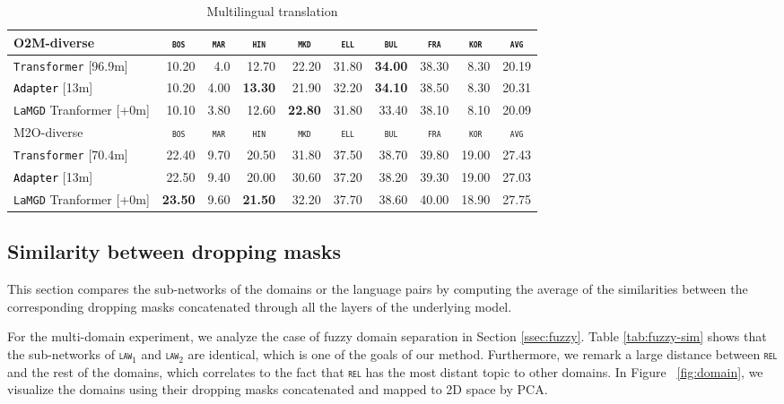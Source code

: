 \documentclass[11pt]{article}
\newcommand{\revision}[1]{\textcolor{black}{#1}}
\newcommand{\domain}[1]{\texttt{\textsc{#1}}}
\newcommand{\system}[1]{\texttt{{#1}}}
\newcommand{\SB}[1]{\textbf{#1}}
\begin{document}
\begin{table}[h!]
\begin{tabular}{|p{4cm}|*{9}{r|}}
    \hline
    \hline
    O2M-diverse & \multicolumn{1}{c|}{\domain{bos}} & \multicolumn{1}{c|}{\domain{mar}} & \multicolumn{1}{c|}{\domain{hin}} & \multicolumn{1}{c|}{\domain{mkd}} & \multicolumn{1}{c|}{\domain{ell}} & \multicolumn{1}{c|}{\domain{bul}} & \multicolumn{1}{c|}{\domain{fra}} & \multicolumn{1}{c|}{\domain{kor}} & \multicolumn{1}{c|}{\domain{avg}} \\ \hline 
    \system{Transformer}  \hfill{\footnotesize[96.9m]} & 10.20&4.0&12.70&22.20&31.80&\SB{34.00}&38.30&8.30&20.19 \\
    \revision{\system{Adapter}}   \hfill{\footnotesize[13m]}  &10.20&4.00&\SB{13.30}&21.90&32.20&\SB{34.10}&38.50&8.30&20.31 \\ 
    \system{LaMGD} Tranformer   \hfill{\footnotesize[+0m]}&10.10&3.80&12.60&\SB{22.80}&31.80&33.40&38.10&8.10&20.09\\
    \hline 
    \hline
    M2O-diverse & \multicolumn{1}{c|}{\domain{bos}} & \multicolumn{1}{c|}{\domain{mar}} & \multicolumn{1}{c|}{\domain{hin}} & \multicolumn{1}{c|}{\domain{mkd}} & \multicolumn{1}{c|}{\domain{ell}} & \multicolumn{1}{c|}{\domain{bul}} & \multicolumn{1}{c|}{\domain{fra}} & \multicolumn{1}{c|}{\domain{kor}} & \multicolumn{1}{c|}{\domain{avg}} \\ \hline 
    \system{Transformer}  \hfill{\footnotesize[70.4m]} &22.40&9.70&20.50&31.80&37.50&38.70&39.80&19.00&27.43 \\
    \revision{\system{Adapter}}   \hfill{\footnotesize[13m]}  &22.50&9.40&20.00&30.60&37.20&38.20&39.30&19.00&27.03\\ 
    \system{LaMGD} Tranformer  \hfill{\footnotesize[+0m]} &\SB{23.50}&9.60&\SB{21.50}&32.20&37.70&38.60&40.00&18.90&27.75 \\
    \hline
  \end{tabular}
  \caption{Multilingual translation}
  \label{tab:multilingual}
\end{table}

\subsection{Similarity between dropping masks}
\label{ssec:abalation}
This section compares the sub-networks of the domains or the language pairs by computing the average of the similarities between the corresponding dropping masks concatenated through all the layers of the underlying model.

For the multi-domain experiment, we analyze the case of fuzzy domain separation in Section \ref{ssec:fuzzy}. Table \ref{tab:fuzzy-sim} shows that the sub-networks of \domain{law$_1$} and \domain{law$_2$} are identical, which is one of the goals of our method. Furthermore, we remark a large distance between \domain{rel} and the rest of the domains, which correlates to the fact that \domain{rel} has the most distant topic to other domains. In Figure ~\ref{fig:domain}, we visualize the domains using their dropping masks concatenated and mapped to 2D space by PCA.
\end{document}

